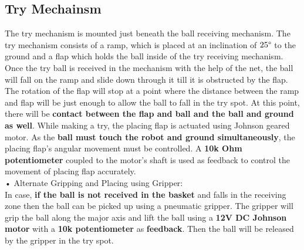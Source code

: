     \subsection{Try Mechainsm}
        The try mechanism is mounted just beneath the ball receiving mechanism. The try mechanism consists of a ramp, which is placed at an 
        inclination of \textbf{$25 \degree$} to the ground and a flap which holds the ball inside of the try receiving mechanism. Once the try ball is received 
        in the mechanism with the help of the net, the ball will fall on the ramp and slide down through it till it is obstructed by the flap. 
        The rotation of the flap will stop at a point where the distance between the ramp and flap will be just enough to allow the ball to fall 
        in the try spot. At this point, there will be \textbf{contact between the flap and ball and the ball and ground as well}. While making a try, the 
        placing flap is actuated using Johnson geared motor. As the \textbf{ball must touch the robot and ground simultaneously}, the placing flap’s angular 
        movement must be controlled. A \textbf{10k Ohm potentiometer} coupled to the motor’s shaft is used as feedback to control the movement of placing 
        flap accurately.\\
        •  Alternate Gripping and Placing using Gripper:\\
            In case, \textbf{if the ball is not received in the basket} and falls in the receiving zone then the ball can be picked up using a pneumatic
            gripper. The gripper will grip the ball along the major axis and lift the ball using a \textbf{12V DC Johnson motor} with a \textbf{10k potentiometer}
            as \textbf{feedback}. Then the ball will be released by the gripper in the try spot.




